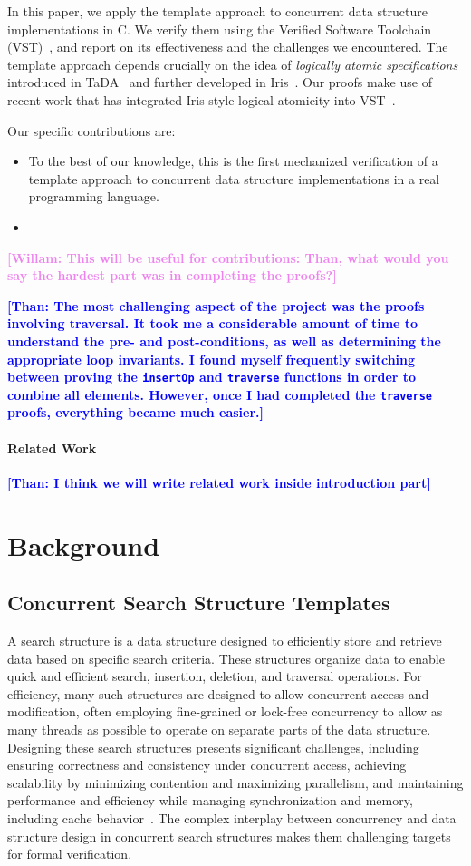 \documentclass[a4paper,UKenglish,cleveref, autoref, thm-restate]{lipics-v2021}
\newcommand{\than}[1]{\textbf{\textcolor{blue}{[Than: #1]}}}
\newcommand{\wm}[1]{\textbf{\textcolor{violet}{[Willam: #1]}}}
\begin{document}
In this paper, we apply the template approach to concurrent data structure implementations in C. We verify them using the Verified Software Toolchain (VST)~\cite{plfcc}, and report on its effectiveness and the challenges we encountered. The template approach depends crucially on the idea of \emph{logically atomic specifications} introduced in TaDA~\cite{tada} and further developed in Iris~\cite{iris}. Our proofs make use of recent work that has integrated Iris-style logical atomicity into VST~\cite{iris-vst-arxiv}.

Our specific contributions are:
\begin{itemize}
\item To the best of our knowledge, this is the first mechanized verification of a template approach to concurrent data structure implementations in a real programming language.
\item 
\end{itemize}
\wm{This will be useful for contributions: Than, what would you say the hardest part was in completing the proofs?}

\than{The most challenging aspect of the project was the proofs involving traversal. It took me a considerable amount of time to understand the pre- and post-conditions, as well as determining the appropriate loop invariants. I found myself frequently switching between proving the \texttt{insertOp} and \texttt{traverse} functions in order to combine all elements. However, once I had completed the \texttt{traverse} proofs, everything became much easier.} 

\paragraph*{Related Work}
\than{I think we will write related work inside introduction part}

\section{Background}
\subsection{Concurrent Search Structure Templates}

A search structure is a data structure designed to efficiently store and retrieve data based on specific search criteria. These structures organize data to enable quick and efficient search, insertion, deletion, and traversal operations. For efficiency, many such structures are designed to allow concurrent access and modification, often employing fine-grained or lock-free concurrency to allow as many threads as possible to operate on separate parts of the data structure. Designing these search structures presents significant challenges, including ensuring correctness and consistency under concurrent access, achieving scalability by minimizing contention and maximizing parallelism, and maintaining performance and efficiency while managing synchronization and memory, including cache behavior~\cite{masstree}. The complex interplay between concurrency and data structure design in concurrent search structures makes them challenging targets for formal verification.
\end{document}
